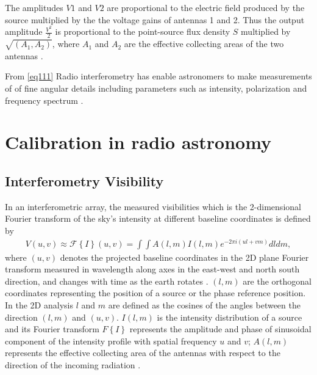 The amplitudes $V1$ and $V2$ are proportional to the electric field produced by the  source multiplied by the the voltage gains of antennas 1 and 2.  Thus the output amplitude $\frac{V^2}{2}$ is proportional to the point-source flux density $S$ multiplied by $\sqrt{(A_1, A_2)}$, where $A_1$ and $A_2$ are the effective collecting areas of the two antennas \citep{NRAO}.

From \ref{eq111} 
Radio interferometry has enable astronomers to make measurements of  of fine angular  details including parameters such as intensity, polarization and frequency spectrum \citep{thompson2001interferometry}.

\section{Calibration in radio astronomy}
\label{Calibr}
\subsection{Interferometry Visibility}
In an interferometric array, the measured visibilities  which is the 2-dimensional Fourier transform of the sky's intensity at different baseline coordinates is defined by
\begin{align}
V(u,v)\approx \mathcal{F}\left\{I\right\}(u,v)=\int \int A(l,m) I (l,m)e^{-2\pi i(ul+vm)} dl dm,
\label{Vis}
\end{align}
where $(u,v)$ denotes the projected baseline coordinates in the 2D plane Fourier transform measured in wavelength along axes in the east-west and north south direction,  and changes with time as the earth rotates  \citep{taylor1999synthesis}. $(l, m)$ are the orthogonal coordinates representing the position of a source or the phase reference position. In the 2D analysis $l$ and $m$ are defined as the cosines of the  angles between the direction $(l,m)$ and $(u, v)$. $I(l,m)$ is the intensity distribution of a source and its Fourier transform  ${F}\left\{I\right\}$ represents the amplitude and phase of sinusoidal component of the intensity profile with spatial frequency $u$ and $v$; $A(l, m)$ represents the effective collecting area of the antennas with respect to the direction of the incoming radiation \citep{thompson2001interferometry}.

